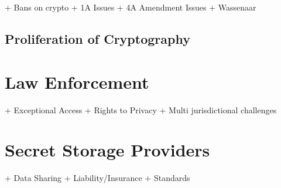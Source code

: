 + Bans on crypto
+ 1A Issues
+ 4A Amendment Issues
+ Wassenaar

\subsection{Proliferation of Cryptography}
\label{chap:policy:crypto:proliferation}


\section{Law Enforcement}
\label{chap:policy:leo}

+ Exceptional Access
+ Rights to Privacy
+ Multi jurisdictional challenges

\section{Secret Storage Providers}
\label{chap:policy:ssp}

+ Data Sharing
+ Liability/Insurance
+ Standards

